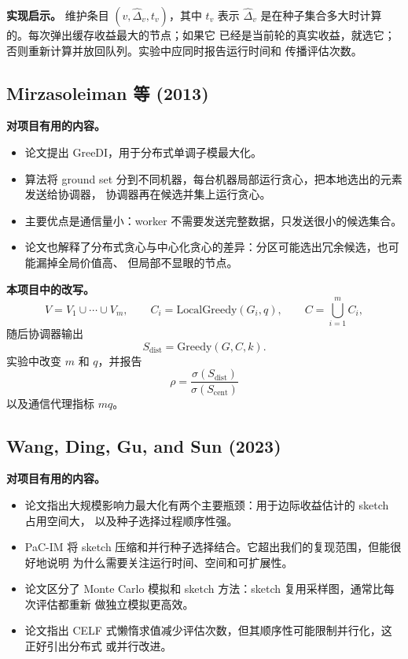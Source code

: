 \documentclass[UTF8,10pt]{ctexart}
\begin{document}
\textbf{实现启示。} 维护条目 $(v,\widehat{\Delta}_v,t_v)$，其中 $t_v$ 表示
$\widehat{\Delta}_v$ 是在种子集合多大时计算的。每次弹出缓存收益最大的节点；如果它
已经是当前轮的真实收益，就选它；否则重新计算并放回队列。实验中应同时报告运行时间和
传播评估次数。

\subsection{Mirzasoleiman 等 (2013)}

\textbf{对项目有用的内容。}
\begin{itemize}
\item 论文提出 GreeDI，用于分布式单调子模最大化。
\item 算法将 ground set 分到不同机器，每台机器局部运行贪心，把本地选出的元素发送给协调器，
协调器再在候选并集上运行贪心。
\item 主要优点是通信量小：worker 不需要发送完整数据，只发送很小的候选集合。
\item 论文也解释了分布式贪心与中心化贪心的差异：分区可能选出冗余候选，也可能漏掉全局价值高、
但局部不显眼的节点。
\end{itemize}

\textbf{本项目中的改写。}
\[
    V=V_1\cup\cdots\cup V_m,\qquad
    C_i=\text{LocalGreedy}(G_i,q),\qquad
    C=\bigcup_{i=1}^{m}C_i,
\]
随后协调器输出
\[
    S_{\mathrm{dist}}=\text{Greedy}(G,C,k).
\]
实验中改变 $m$ 和 $q$，并报告
\[
    \rho=\frac{\sigma(S_{\mathrm{dist}})}{\sigma(S_{\mathrm{cent}})}
\]
以及通信代理指标 $mq$。

\subsection{Wang, Ding, Gu, and Sun (2023)}

\textbf{对项目有用的内容。}
\begin{itemize}
\item 论文指出大规模影响力最大化有两个主要瓶颈：用于边际收益估计的 sketch 占用空间大，
以及种子选择过程顺序性强。
\item PaC-IM 将 sketch 压缩和并行种子选择结合。它超出我们的复现范围，但能很好地说明
为什么需要关注运行时间、空间和可扩展性。
\item 论文区分了 Monte Carlo 模拟和 sketch 方法：sketch 复用采样图，通常比每次评估都重新
做独立模拟更高效。
\item 论文指出 CELF 式懒惰求值减少评估次数，但其顺序性可能限制并行化，这正好引出分布式
或并行改进。
\end{itemize}
\end{document}
